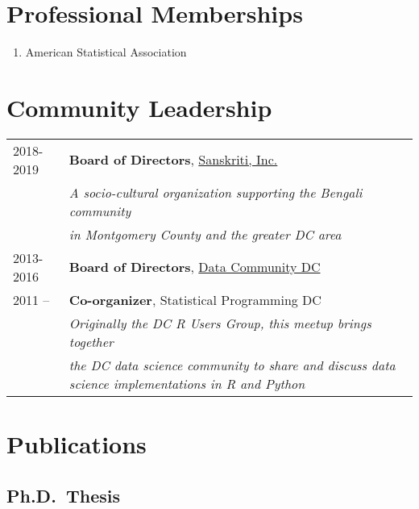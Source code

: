 \documentclass[11pt, a4paper]{awesome-cv}
\providecommand{\tightlist}{%
	\setlength{\itemsep}{0pt}\setlength{\parskip}{0pt}}
\newcounter{papers}
\begin{document}
\hypertarget{professional-memberships}{%
\section{Professional Memberships}\label{professional-memberships}}

\begin{enumerate}
\def\labelenumi{\arabic{enumi}.}
\tightlist
\item
  American Statistical Association
\end{enumerate}

\hypertarget{community-leadership}{%
\section{Community Leadership}\label{community-leadership}}

\begin{tabular}{ll}
  2018-2019 & \textbf{Board of Directors}, \href{http://www.sanskriti-dc.org}{Sanskriti, Inc.} \\ 
   & \emph{A socio-cultural organization supporting the Bengali community} \\ 
   & \emph{in Montgomery County and the greater DC area} \\ 
  2013-2016 & \textbf{Board of Directors}, \href{https://www.datacommunitydc.org}{Data Community DC} \\ 
  2011 -- & \textbf{Co-organizer}, Statistical Programming DC \\ 
   & \emph{Originally the DC R Users Group, this meetup brings together} \\ 
   & \emph{the DC data science community to share and discuss data science implementations in R and Python} \\ 
  \end{tabular}

\hypertarget{publications}{%
\section{Publications}\label{publications}}

\hypertarget{ph.d.-thesis}{%
\subsection{Ph.D.~Thesis}\label{ph.d.-thesis}}

\newrefcontext[sorting=none]\setcounter{papers}{0}\pagebreak[3]
\printbibliography[category=bib-/Users/abhijit/Dropbox/Resume_CV/pubmed.bib-521302.3,heading=none]\setcounter{papers}{0}
\end{document}
